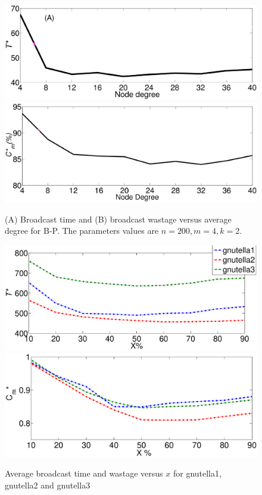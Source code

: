 \begin{figure}
\centering
\includegraphics[scale=0.19]{./texfiles/Chapter_3/netsci/figs1/random_graphs_delay1.eps}
\includegraphics[scale=0.18]{./texfiles/Chapter_3/netsci/figs1/random_graphs_wastage1.eps}
\caption{(A) Broadcast time and (B) broadcast wastage versus average degree for B-P. The parameters values are $n=200, m=4, k=2$.\vspace{4mm}}
\label{DiffTopologyGnp_N200_varyD_push_pull}
\end{figure}
\begin{figure}
\centering
\includegraphics[scale=0.19]{./texfiles/Chapter_3/netsci/figs1/xperbt.eps}
\includegraphics[scale=0.19]{./texfiles/Chapter_3/netsci/figs1/xperwa.eps}
\caption{Average broadcast time and wastage versus $x$ for gnutella1, gnutella2 and gnutella3}
\label{ps_bt}
\end{figure}


